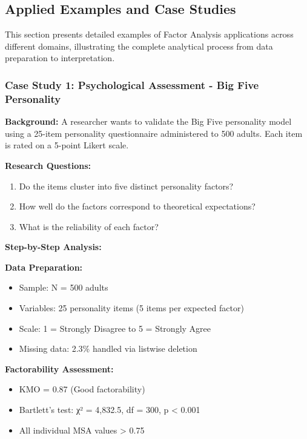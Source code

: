 \documentclass[
]{article}
\begin{document}
\subsection{Applied Examples and Case Studies}

This section presents detailed examples of Factor Analysis applications
across different domains, illustrating the complete analytical process
from data preparation to interpretation.

\subsubsection{Case Study 1: Psychological Assessment - Big Five
Personality}

\textbf{Background:} A researcher wants to validate the Big Five
personality model using a 25-item personality questionnaire administered
to 500 adults. Each item is rated on a 5-point Likert scale.

\textbf{Research Questions:}

\begin{enumerate}
\item
  Do the items cluster into five distinct personality factors?
\item
  How well do the factors correspond to theoretical expectations?
\item
  What is the reliability of each factor?
\end{enumerate}

\textbf{Step-by-Step Analysis:}

\textbf{Data Preparation:}

\begin{itemize}
\item
  Sample: N = 500 adults
\item
  Variables: 25 personality items (5 items per expected factor)
\item
  Scale: 1 = Strongly Disagree to 5 = Strongly Agree
\item
  Missing data: 2.3\% handled via listwise deletion
\end{itemize}

\textbf{Factorability Assessment:}

\begin{itemize}
\item
  KMO = 0.87 (Good factorability)
\item
  Bartlett's test: χ² = 4,832.5, df = 300, p \textless{} 0.001
\item
  All individual MSA values \textgreater{} 0.75
\end{itemize}
\end{document}
